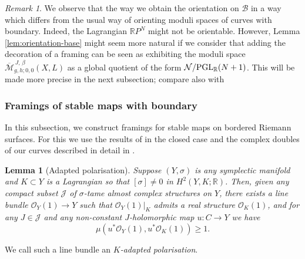 \documentclass[11pt,psamsfonts, oneside, reqno]{amsart}
\newcommand{\sub}{\subset}%
\newcommand{\cl}{\colon}
\newcommand{\scJ}{\mathscr{J}}
\newcommand{\PGL}{\normalfont\text{PGL}}
\newcommand{\Mbar}{\overline{\mathcal M}}
\newcommand{\bR}{\mathbb{R}}
\newcommand{\cB}{\mathcal{B}}
\newcommand{\cN}{\mathcal{N}}
\newcommand{\cO}{\mathcal{O}}
\newtheorem{lemma}[theorem]{Lemma}
\theoremstyle{definition}
\theoremstyle{remark}
\newtheorem{remark}[theorem]{Remark}
\numberwithin{equation}{section}
\begin{document}
\begin{remark}\label{} We observe that the way we obtain the orientation on $\cB$ in a way which differs from the usual way of orienting moduli spaces of curves with boundary. Indeed, the Lagrangian $\bR P^N$ might not be orientable. However, Lemma \ref{lem:orientation-base} might seem more natural if we consider that adding the decoration of a framing can be seen as exhibiting the moduli space $\Mbar_{g,h;0,0}^{\,J,\,\beta}(X,L)$ as a global quotient of the form $\cN/\PGL_\bR(N+1)$. This will be made more precise in the next subsection; compare also with \cite[Discussion~3.16]{HS22}\end{remark}


\subsubsection{Framings of stable maps with boundary}\label{subsec:framings} In this subsection, we construct framings for stable maps on bordered Riemann surfaces. For this we use the results of \cite{HS22} in the closed case and the complex doubles of our curves described in detail in \cite[]{KL06}.

\begin{lemma}[Adapted polarisation] \label{lem:adapted-polarisation} Suppose $(Y,\sigma)$ is any symplectic manifold and $K\sub Y$ is a Lagrangian so that $[\sigma]\ne 0$ in $H^2(Y,K;\bR)$. Then, given any compact subset $\scJ$ of $\sigma$-tame almost complex structures on $Y$, there exists a line bundle $\cO_Y(1)\to Y$ such that $\cO_Y(1)|_K$ admits a real structure $\cO_K(1)$, and for any $J \in \scJ$ and any non-constant $J$-holomorphic map $u \cl C\to Y$ we have $$\mu(u^*\cO_Y(1),u^*\cO_K(1)) \geq 1.$$
\end{lemma}

\noindent
We call such a line bundle an \emph{$K$-adapted polarisation}.
\end{document}
